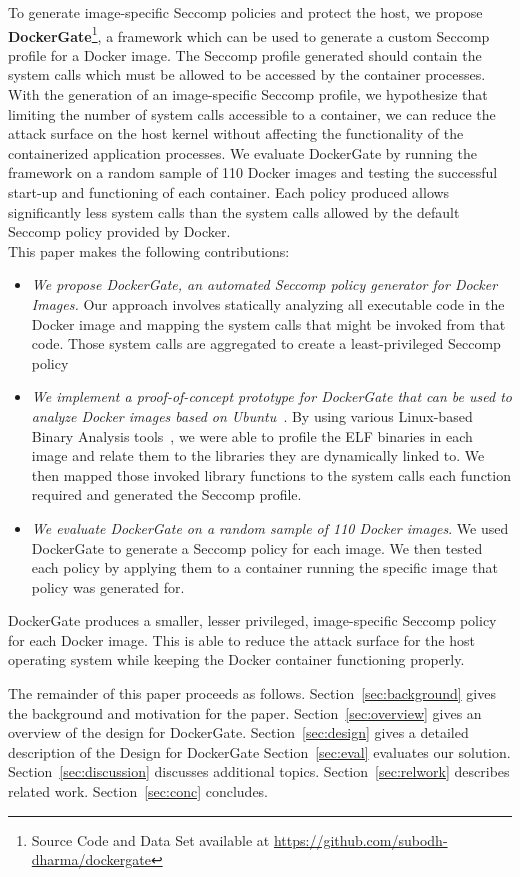 To generate image-specific Seccomp policies and protect the host, we propose \textbf{DockerGate}\footnote{Source Code and Data Set available at \url{https://github.com/subodh-dharma/dockergate}}, a framework which can be used to generate a custom Seccomp profile for a Docker image. The Seccomp profile generated should contain the system calls which must be allowed to be accessed by the container processes. With the generation of an image-specific Seccomp profile, we hypothesize that limiting the number of system calls accessible to a container, we can reduce the attack surface on the host kernel without affecting the functionality of the containerized application processes. We evaluate DockerGate by running the framework on a random sample of 110 Docker images and testing the successful start-up and functioning of each container. Each policy produced allows significantly less system calls than the system calls allowed by the default Seccomp policy provided by Docker.
\hfill \break
\\This paper makes the following contributions:
\begin{itemize}
\item
\textit{We propose DockerGate, an automated Seccomp policy generator for Docker Images.} Our approach involves statically analyzing all executable code in the Docker image and mapping the system calls that might be invoked from that code. Those system calls are aggregated to create a least-privileged Seccomp policy 
\end{itemize}
\begin{itemize}
\item 
\textit{We implement a proof-of-concept prototype for DockerGate that can be used to analyze Docker images based on Ubuntu~\cite{ubuntu}}. By using various Linux-based Binary Analysis tools~\cite{nm,ldd,objdump}, we were able to profile the ELF binaries in each image and relate them to the libraries they are dynamically linked to. We then mapped those invoked library functions to the system calls each function required and generated the Seccomp profile.
\end{itemize}
\begin{itemize}
\item
\textit{We evaluate DockerGate on a random sample of 110 Docker images}. We used DockerGate to generate a Seccomp policy for each image. We then tested each policy by applying them to a container running the specific image that policy was generated for.
\end{itemize}

 DockerGate produces a smaller, lesser privileged, image-specific Seccomp policy for each Docker image. This is able to reduce the attack surface for the host operating system while keeping the Docker container functioning properly.

The remainder of this paper proceeds as follows.
Section~\ref{sec:background} gives the background and motivation for the paper.
Section~\ref{sec:overview} gives an overview of the design for DockerGate.
Section~\ref{sec:design} gives a detailed description of the Design for DockerGate
Section~\ref{sec:eval} evaluates our solution.
Section~\ref{sec:discussion} discusses additional topics.
Section~\ref{sec:relwork} describes related work. Section~\ref{sec:conc}
concludes.

